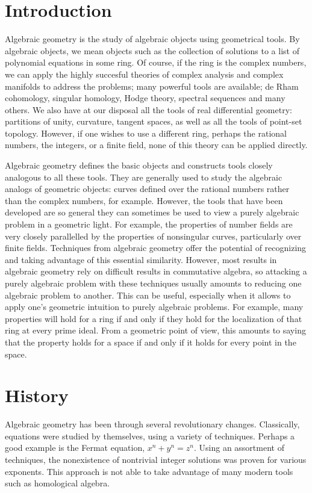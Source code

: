 \documentclass[12pt]{article}
\newcommand{\sect}[1]{\clearpage\section*{#1}}
\begin{document}
\raggedbottom
\sect{Introduction}

Algebraic geometry is the study of algebraic objects using geometrical tools. By algebraic objects, we mean objects such as the collection of solutions to a list of polynomial equations in some ring. Of course, if the ring is the complex numbers, we can apply the highly succesful theories of complex analysis and complex manifolds to address the problems; many powerful tools are available; de Rham cohomology, singular homology, Hodge theory, spectral sequences and many others.  We also have at our disposal all the tools of real differential geometry: partitions of unity, curvature, tangent spaces, as well as all the tools of point-set topology. However, if one wishes to use a different ring, perhaps the rational numbers, the integers, or a finite field, none of this theory can be applied directly.

Algebraic geometry defines the basic objects and constructs tools closely analogous to all these tools.  They are generally used to study the algebraic analogs of geometric objects: curves defined over the rational numbers rather than the complex numbers, for example.  However, the tools that have been developed are so general they can sometimes be used to view a purely algebraic problem in a geometric light.  For example, the properties of number fields are very closely parallelled by the properties of nonsingular curves, particularly over finite fields.  Techniques from algebraic geometry offer the potential of recognizing and taking advantage of this essential similarity.  However, most results in algebraic geometry rely on difficult results in commutative algebra, so attacking a purely algebraic problem with these techniques usually amounts to reducing one algebraic problem to another.  This can be useful, especially when it allows to apply one's geometric intuition to purely algebraic problems.  For example, many properties will hold for a ring if and only if they hold for the localization of that ring at every prime ideal.  From a geometric point of view, this amounts to saying that the property holds for a space if and only if it holds for every point in the space. 

\sect{History}
Algebraic geometry has been through several revolutionary changes. Classically, equations were studied by themselves, using a variety of techniques. Perhaps a good example is the Fermat equation, $x^n+y^n=z^n$. Using an assortment of techniques, the nonexistence of nontrivial integer solutions was proven for various exponents. This approach is not able to take advantage of many modern tools such as homological algebra. 
\end{document}
